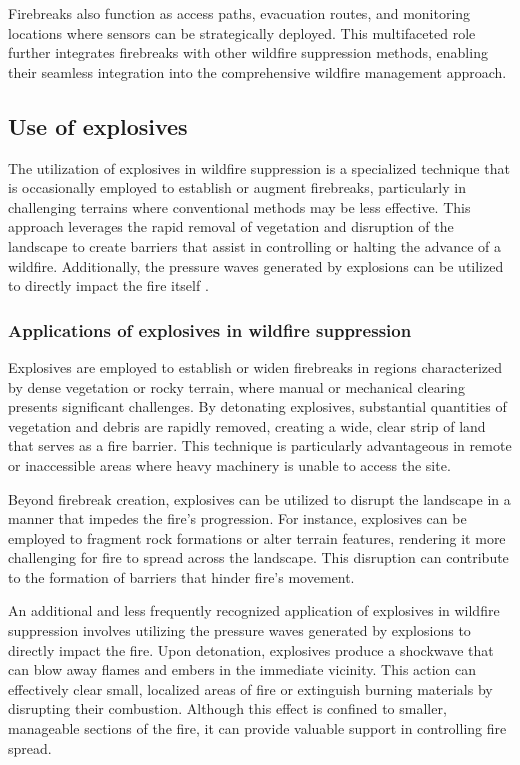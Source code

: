\documentclass[
  12 pt,
]{Nemilov}
\begin{document}
Firebreaks also function as access paths, evacuation routes, and monitoring locations where sensors can be strategically deployed. This multifaceted role further integrates firebreaks with other wildfire suppression methods, enabling their seamless integration into the comprehensive wildfire management approach.

\subsection{Use of explosives}\label{use-of-explosives}

The utilization of explosives in wildfire suppression is a specialized technique that is occasionally employed to establish or augment firebreaks, particularly in challenging terrains where conventional methods may be less effective. This approach leverages the rapid removal of vegetation and disruption of the landscape to create barriers that assist in controlling or halting the advance of a wildfire. Additionally, the pressure waves generated by explosions can be utilized to directly impact the fire itself \citep{mckinty1958use}.

\subsubsection{Applications of explosives in wildfire suppression}\label{applications-of-explosives-in-wildfire-suppression}

Explosives are employed to establish or widen firebreaks in regions characterized by dense vegetation or rocky terrain, where manual or mechanical clearing presents significant challenges. By detonating explosives, substantial quantities of vegetation and debris are rapidly removed, creating a wide, clear strip of land that serves as a fire barrier. This technique is particularly advantageous in remote or inaccessible areas where heavy machinery is unable to access the site.

Beyond firebreak creation, explosives can be utilized to disrupt the landscape in a manner that impedes the fire's progression. For instance, explosives can be employed to fragment rock formations or alter terrain features, rendering it more challenging for fire to spread across the landscape. This disruption can contribute to the formation of barriers that hinder fire's movement.

An additional and less frequently recognized application of explosives in wildfire suppression involves utilizing the pressure waves generated by explosions to directly impact the fire. Upon detonation, explosives produce a shockwave that can blow away flames and embers in the immediate vicinity. This action can effectively clear small, localized areas of fire or extinguish burning materials by disrupting their combustion. Although this effect is confined to smaller, manageable sections of the fire, it can provide valuable support in controlling fire spread.
\end{document}
